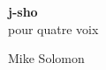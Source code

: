 \documentclass[a4paper]{book}
\begin{document}
\begin{titlepage}
\begin{flushright}
{\Huge \bfseries j-sho \\ }
{\large pour quatre voix \\}
\par
{}
{\Large Mike Solomon}
\end{flushright}
\end{titlepage}
\thispagestyle{empty} 
\frontmatter
\clearpage
\end{document}
